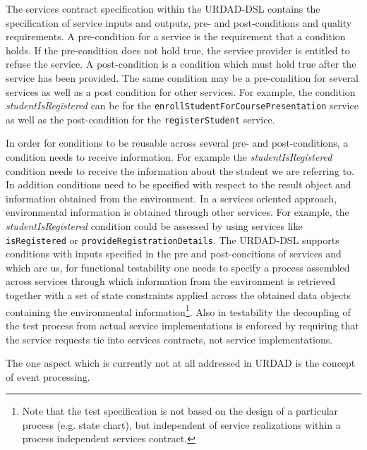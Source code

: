 The services contract specification within the URDAD-DSL contains the specification of service inputs and outputs, pre- and post-conditions and quality requirements. A pre-condition for a service is the requirement that a condition holds. If the pre-condition does not hold true, the service provider is entitled to refuse the service. A post-condition is a condition which must hold true after the service has been provided. The same condition may be a pre-condition for several services as well as a post condition for other services. For example, the condition \emph{studentIsRegistered} can be for the \verb+enrollStudentForCoursePresentation+ service as well as the post-condition for the \verb+registerStudent+ service. 

In order for conditions to be reusable across several pre- and post-conditions, a condition needs to receive information. For example the \emph{studentIsRegistered} condition needs to receive the information about the student we are referring to. In addition conditions need to be specified with respect to the result object and information obtained from the environment. In a services oriented approach, environmental information is obtained through other services. For example, the \emph{studentIsRegistered} condition could be assessed by using services like \verb+isRegistered+ or \verb+provideRegistrationDetails+. The URDAD-DSL supports conditions with inputs specified in the pre and post-concitions of services and which are us, for functional testability one needs to specify a process assembled across services through which information from the environment is retrieved together with a set of state constraints applied across the obtained data objects containing the environmental information\footnote{Note that the test specification is not based on the design of a particular process (e.g. state chart), but independent of service realizations within a process independent services contract.}. Also in testability the decoupling of the test process from actual service implementations is enforced by requiring that the service requests tie into services contracts, not service implementations. 

The one aspect which is currently not at all addressed in URDAD is the concept of event processing.
 

